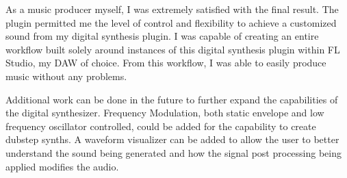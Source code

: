 \documentclass[a4paper,12pt]{report}
\begin{document}
As a music producer myself, I was extremely satisfied with the final result. The plugin permitted me the level of control and flexibility to achieve a customized sound from my digital synthesis plugin. I was capable of creating an entire workflow built solely around instances of this digital synthesis plugin within FL Studio, my DAW of choice. From this workflow, I was able to easily produce music without any problems.

Additional work can be done in the future to further expand the capabilities of the digital synthesizer. Frequency Modulation, both static envelope and low frequency oscillator controlled, could be added for the capability to create dubstep synths. A waveform visualizer can be added to allow the user to better understand the sound being generated and how the signal post processing being applied modifies the audio.
\end{document}
